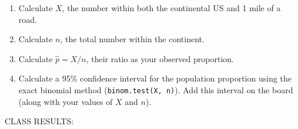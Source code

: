 \documentclass[10pt]{article}\usepackage[]{graphicx}\usepackage[]{color}
\begin{document}
\begin{table}[h]
  \centering
  \end{table}

\begin{enumerate}
  \itemsep0.1in
  \item Calculate $X$, the number within both the continental US and 1 mile of a road.
  \item Calculate $n$, the total number within the continent.
  \item Calculate $\hat{p} = X/n$, their ratio as your observed proportion.
  \item Calculate a 95\% confidence interval for the population proportion using the exact binomial method ({\tt binom.test(X, n)}). Add this interval on the board (along with your values of $X$ and $n$).
\end{enumerate}

\vspace{.2in}

CLASS RESULTS:
\end{document}
